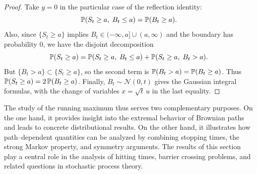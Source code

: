 \begin{proof}
Take $y=0$ in the particular case of the reflection identity:
\[
\mathbb{P}(S_t\ge a,\; B_t\le a)=\mathbb{P}(B_t\ge a).
\]
Also, since $\{S_t\ge a\}$ implies $B_t\in(-\infty,a]\cup(a,\infty)$ and the boundary has probability $0$,
we have the disjoint decomposition
\[
\mathbb{P}(S_t\ge a)=\mathbb{P}(S_t\ge a,\; B_t\le a)+\mathbb{P}(S_t\ge a,\; B_t>a).
\]
But $\{B_t>a\}\subset\{S_t\ge a\}$, so the second term is $\mathbb{P}(B_t>a)=\mathbb{P}(B_t\ge a)$.
Thus $\mathbb{P}(S_t\ge a)=2\,\mathbb{P}(B_t\ge a)$.
Finally, $B_t\sim \mathcal N(0,t)$ gives the Gaussian integral formulas, with the change of variables
$x=\sqrt t\,u$ in the last equality.
\end{proof}


The study of the running maximum thus serves two complementary purposes. On the one hand,
it provides insight into the extremal behavior of Brownian paths and leads to concrete
distributional results. On the other hand, it illustrates how path--dependent quantities
can be analyzed by combining stopping times, the strong Markov property, and symmetry
arguments. The results of this section play a central role in the analysis of hitting
times, barrier crossing problems, and related questions in stochastic process theory.